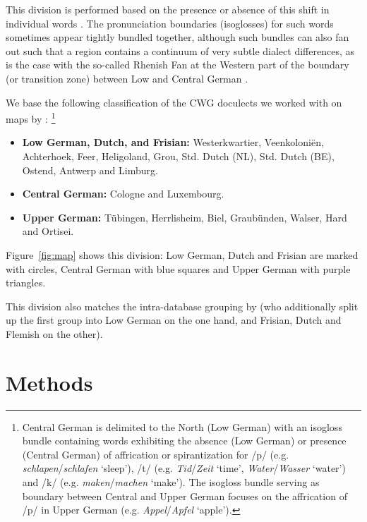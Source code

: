 \documentclass[a4paper]{article}
\begin{document}
This division is performed based on
the presence or absence of this shift in individual words \citep[p. 63]{koenig2015dtv}.
The pronunciation boundaries (isoglosses) for such words
sometimes appear tightly bundled together,
although such bundles can also fan out such that a region
contains a continuum of very subtle dialect differences,
as is the case with the so-called Rhenish Fan at the Western part
of the boundary (or transition zone) between Low and Central German
\citep[pp. 63, 138, 141]{koenig2015dtv}.

We base the following classification of
the CWG doculects we worked with
on maps by \citet[pp. 64, 230--231]{koenig2015dtv}:%
\footnote{%
Central German is delimited %
to the North (Low German) with an isogloss bundle
containing words exhibiting
the absence (Low German) or presence (Central German)
of affrication or spirantization for
/p/ (e.g. \textit{schlapen}/\textit{schlafen} `sleep'),
/t/ (e.g. \textit{Tid}/\textit{Zeit} `time',\linebreak
\textit{Water}/\textit{Wasser} `water') and
/k/ (e.g. \textit{maken}/\textit{machen} `make').
The isogloss bundle serving as boundary between
Central and Upper German focuses on the
affrication of /p/ in Upper German
(e.g. \textit{Appel}/\textit{Apfel} `apple').
}

\begin{itemize}
\item
\textbf{Low German, Dutch, and Frisian:}
Westerkwartier, Veenkoloni\"{e}n, Achterhoek,
Feer, Heligoland, Grou,
Std. Dutch (NL), Std. Dutch (BE), Ostend, Antwerp and Limburg.

\item
\textbf{Central German:}
Cologne and Luxembourg.

\item
\textbf{Upper German:}
T\"{u}bingen, Herrlisheim,
Biel, Graub\"{u}nden, Walser, Hard and Ortisei.
\end{itemize}

Figure~\ref{fig:map} shows this division:
Low German, Dutch and Frisian are marked with circles,
Central German with blue squares and Upper German with purple triangles.

This division also matches the intra-database grouping by \citet{heggarty2018sound}
(who additionally split up the first group into
Low German on the one hand,
and Frisian, Dutch and Flemish on the other).

\section{Methods}
\label{sec:methods}
\end{document}
